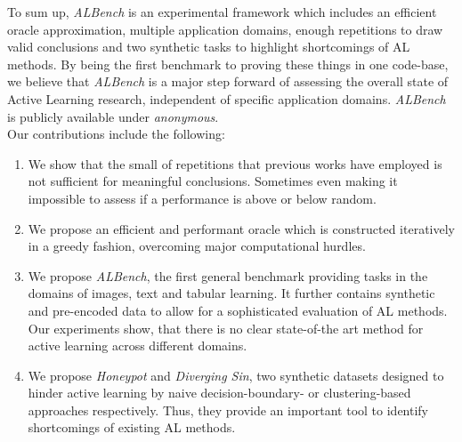 \documentclass[]{article}
\begin{document}
To sum up, \emph{ALBench} is an experimental framework which includes an
efficient oracle approximation, multiple application domains, enough repetitions to
draw valid conclusions and two synthetic tasks to highlight shortcomings of AL methods. 
By being the first benchmark to proving these things in one code-base, 
we believe that \emph{ALBench} is a major step forward of assessing the overall state of Active Learning research, independent of
specific application domains. \emph{ALBench} is publicly available under \emph{anonymous}. \\ [1mm]
Our contributions include the following:
%
\begin{enumerate}
\item\label{cont:repetitions} We show that the small of repetitions that previous works have employed is not
sufficient for meaningful conclusions. Sometimes even making it impossible to assess if a performance is above or below random.
\item\label{cont:oracle} We propose an efficient and performant oracle which is constructed iteratively in a greedy fashion,
overcoming major computational hurdles.
\item\label{cont:domains} We propose \emph{ALBench}, the first general benchmark providing tasks
in the domains of images, text and tabular learning. It further contains
synthetic and pre-encoded data to allow for a sophisticated evaluation of AL
methods. Our experiments show, that there is no clear state-of-the art method
for active learning across different domains.
\item\label{cont:synthdata} We propose \emph{Honeypot} and \emph{Diverging Sin}, two synthetic datasets
designed to hinder active learning by naive decision-boundary- or
clustering-based approaches respectively. Thus, they provide an important tool to identify 
shortcomings of existing AL methods.
\end{enumerate}
%
\end{document}
